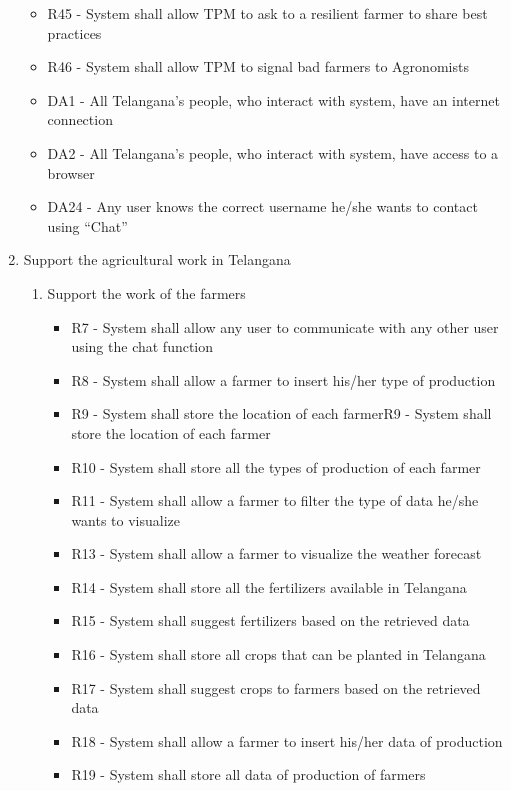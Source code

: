 \begin{enumerate}[label=\textbf{G.\arabic*}]
\begin{itemize}[label =]
        \item R45 - System shall allow TPM to ask to a resilient farmer to share best practices
        \item R46 - System shall allow TPM to signal bad farmers to Agronomists
        \item DA1 - All Telangana’s people, who interact with system, have an internet connection
        \item DA2 - All Telangana’s people, who interact with system, have access to a browser
        \item DA24 - Any user knows the correct username he/she wants to contact using “Chat”
    \end{itemize}
    \item Support the agricultural work in Telangana
    \begin{enumerate} [label=\textbf{G.4.\arabic*}]
        \item Support the work of the farmers
        \begin{itemize} [label =]
            \item R7 - System shall allow any user to communicate with any other user using the chat function
            \item R8 - System shall allow a farmer to insert his/her type of production
            \item R9 - System shall store the location of each farmerR9 - System shall store the location of each farmer
            \item R10 - System shall store all the types of production of each farmer
            \item R11 - System shall allow a farmer to filter the type of data he/she wants to visualize
            \item R13 - System shall allow a farmer to visualize the weather forecast
            \item R14 - System shall store all the fertilizers available in Telangana
            \item R15 - System shall suggest fertilizers based on the retrieved data
            \item R16 - System shall store all crops that can be planted in Telangana
            \item R17 - System shall suggest crops to farmers based on the retrieved data
            \item R18 - System shall allow a farmer to insert his/her data of production
            \item R19 - System shall store all data of production of farmers

\end{itemize}
\end{enumerate}
\end{enumerate}
